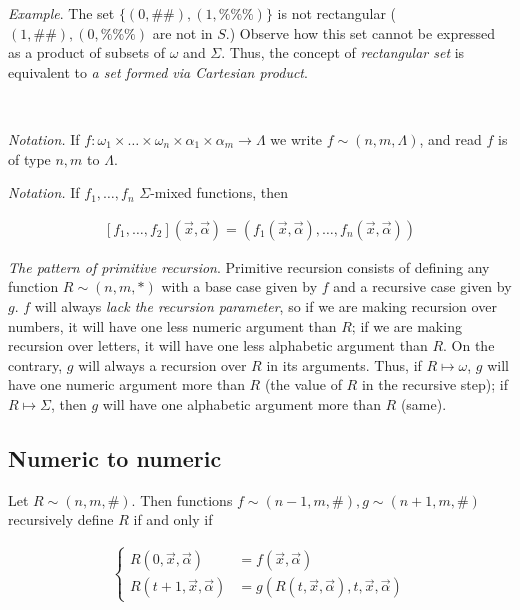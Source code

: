 \documentclass[a4paper, 12pt]{article}
\begin{document}
\textit{Example}. The set $\{(0, \#\#), (1, \%\%\%)\}$ is not rectangular ($(1,
\#\#), (0, \%\%\%)$ are not in $S$.) Observe how this set cannot be expressed as
a product of subsets of $\omega$ and $\Sigma$. Thus, the concept of
\textit{rectangular set} is equivalent to \textit{a set formed via Cartesian
product}.

~

\textit{Notation.} If $f : \omega_1 \times \ldots \times \omega_n \times
\alpha_1 \times \alpha_m \to \Lambda$ we write $f \sim (n, m, \Lambda)$, and
read $f$ is of type $n, m$ to $\Lambda$.

\textit{Notation.} If $f_1, \ldots, f_n$ $\Sigma$-mixed functions, then 

\begin{align*}
    \left[ f_1, \ldots, f_2 \right](\overrightarrow{x}, \overrightarrow{\alpha})
    = \left( f_1(\overrightarrow{x}, \overrightarrow{\alpha}), \ldots,
    f_n(\overrightarrow{x}, \overrightarrow{\alpha}) \right) 
\end{align*}


\textit{The pattern of primitive recursion}. Primitive recursion consists of
defining any function $R \sim (n, m, *)$ with a base case given by $f$ and a
recursive case given by $g$. $f$ will always \textit{lack the recursion
parameter}, so if we are making recursion over numbers, it will have one less
numeric argument than $R$; if we are making recursion over letters, it will have
one less alphabetic argument than $R$. On the contrary, $g$ will always a
recursion over $R$ in its arguments. Thus, if $R \mapsto \omega$, $g$ will have
one numeric argument more than $R$ (the value of $R$ in the recursive step); if
$R \mapsto \Sigma$, then $g$ will have one alphabetic argument more than $R$
(same).

\subsection{Numeric to numeric}

Let $R \sim (n, m, \#)$. Then functions $f \sim (n - 1, m, \#), g \sim (n + 1,
m, \#)$ recursively define $R$ if and only if 

\begin{align*}
\begin{cases}
    R(0, \overrightarrow{x}, \overrightarrow{\alpha}) &= f(
        \overrightarrow{x}, \overrightarrow{\alpha}) \\
    R(t + 1, \overrightarrow{x}, \overrightarrow{\alpha}) &= g \left( R(t,
        \overrightarrow{x}, \overrightarrow{\alpha}), t, \overrightarrow{x},
    \overrightarrow{\alpha} \right)
\end{cases}
\end{align*}
\end{document}
